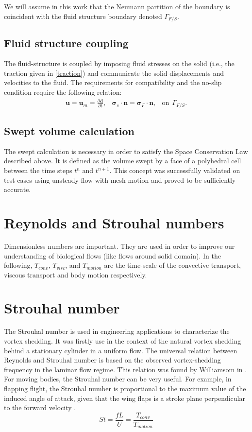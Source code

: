 \documentclass[10pt,a4paper,twoside]{article}
\begin{document}
We will assume in this work that the Neumann partition of the boundary is coincident with the fluid structure boundary denoted $\Gamma_{F/S}$.
\subsection{Fluid structure coupling}
The fluid-structure is coupled by imposing fluid stresses on the solid (i.e., the traction given in \ref{traction}) and communicate the solid displacements and velocities to the fluid. The requirements for compatibility and the no-slip condition require the following relation:
\begin{eqnarray}
\boldsymbol{u}  = \boldsymbol{u}_m = \frac{\partial \boldsymbol{d}}{\partial t}, & \boldsymbol{\sigma}_s \cdot \boldsymbol{n} = \boldsymbol{\sigma}_F \cdot \boldsymbol{n}, & \text{on} ~~  \Gamma_{F/S}.
\end{eqnarray}


\subsection{Swept volume calculation}
The swept calculation is necessary in order to satisfy the Space Conservation Law described above. It is defined as the volume swept by a face of a polyhedral cell between the time steps $t^n$ and $t^{n+1}$. This concept was successfully validated on test cases using unsteady flow with mesh motion and proved to be sufficiently accurate. 
\section{Reynolds and Strouhal numbers}
Dimensionless numbers are important. They are used in order to improve our understanding of biological flows (like flows around solid domain).
In the following, $T_{conv}$, $T_{visc}$, and $T_{motion}$ are the time-scale of the convective transport, viscous transport and body motion respectively.
\section{Strouhal number}
The Strouhal number is used in engineering applications to characterize the vortex shedding. It was firstly use in the context of the natural vortex shedding behind a stationary cylinder in a uniform flow. The universal relation between Reynolds and Strouhal number is based on the observed vortex-shedding frequency in the laminar flow regime. This relation was found by Williamsom in \cite{williamson1988defining}. For moving bodies, the Strouhal number can be very useful. For example, in flapping flight, the Strouhal number is proportional to the maximum value of the induced angle of attack, given that the wing flaps is a stroke plane perpendicular to the forward velocity \cite{bos2010numerical}. 
\begin{equation}
St = \frac{fL}{U} = \frac{T_{conv}}{T_{motion}}
\end{equation}
\end{document}

